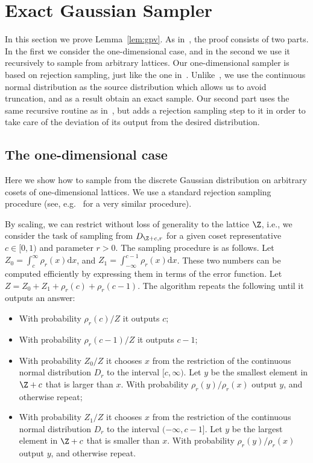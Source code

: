 \section{Exact Gaussian Sampler}
\label{sec:exactgpv}

In this section we prove Lemma~\ref{lem:gpv}. 
As in~\cite{DBLP:conf/stoc/GentryPV08}, the proof consists of two parts. 
In the first we consider the one-dimensional case, and in the second we use
it recursively to sample from arbitrary lattices. Our one-dimensional
sampler is based on rejection sampling, just like the one in~\cite{DBLP:conf/stoc/GentryPV08}.
Unlike~\cite{DBLP:conf/stoc/GentryPV08}, we use the continuous normal distribution as the source distribution
which allows us to avoid truncation, and as a result obtain an exact sample. 
Our second part uses the same recursive routine as in~\cite{DBLP:conf/stoc/GentryPV08},
but adds a rejection sampling step to it in order to take care of the deviation 
of its output from the desired distribution. 

\subsection{The one-dimensional case}

Here we show how to sample from the discrete Gaussian distribution on arbitrary cosets of
one-dimensional lattices. We use a standard rejection sampling procedure (see, e.g.~\cite[Page 117]{DevroyeBook86}
for a very similar procedure).

By scaling, we can restrict without loss of generality to the lattice $\Z$, i.e.,
we consider the task of sampling from $D_{\Z+c,r}$ for a given coset representative $c \in [0,1)$ and parameter $r>0$.
The sampling procedure is as follows. Let $Z_0 = \int_c^\infty \rho_r(x) \mathrm{d} x$, and $Z_1 = \int_{-\infty}^{c-1} \rho_r(x) \mathrm{d} x$.
These two numbers can be computed efficiently by expressing them in terms of the error function. Let $Z=Z_0+Z_1+\rho_r(c)+\rho_r(c-1)$.
The algorithm repeats the following until it outputs an answer: 
\begin{itemize}
\item With probability $\rho_r(c)/Z$ it outputs $c$;
\item With probability $\rho_r(c-1)/Z$ it outputs $c-1$;
\item With probability $Z_0/Z$ it chooses $x$ from the restriction of the continuous normal distribution $D_r$ to the interval $[c,\infty)$. Let $y$
be the smallest element in $\Z+c$ that is larger than $x$. With probability $\rho_r(y)/\rho_r(x)$ output $y$, and otherwise repeat;
\item With probability $Z_1/Z$ it chooses $x$ from the restriction of the continuous normal distribution $D_r$ to the interval $(-\infty,c-1]$. Let $y$
be the largest element in $\Z+c$ that is smaller than $x$. With probability $\rho_r(y)/\rho_r(x)$ output $y$, and otherwise repeat.
\end{itemize}

